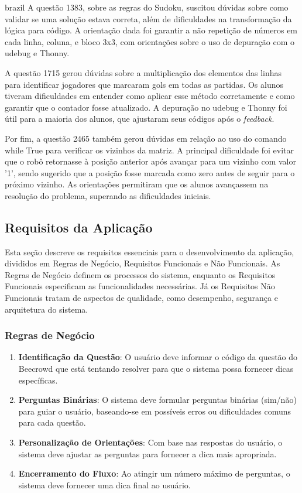\begin{otherlanguage*}{brazil}
A questão 1383, sobre as regras do Sudoku, suscitou dúvidas sobre como validar se uma solução estava correta, além de dificuldades na transformação da lógica para código. A orientação dada foi garantir a não repetição de números em cada linha, coluna, e bloco 3x3, com orientações sobre o uso de depuração com o udebug e Thonny.

A questão 1715 gerou dúvidas sobre a multiplicação dos elementos das linhas para identificar jogadores que marcaram gols em todas as partidas. Os alunos tiveram dificuldades em entender como aplicar esse método corretamente e como garantir que o contador fosse atualizado. A depuração no udebug e Thonny foi útil para a maioria dos alunos, que ajustaram seus códigos após o \textit{feedback}.

Por fim, a questão 2465 também gerou dúvidas em relação ao uso do comando while True para verificar os vizinhos da matriz. A principal dificuldade foi evitar que o robô retornasse à posição anterior após avançar para um vizinho com valor '1', sendo sugerido que a posição fosse marcada como zero antes de seguir para o próximo vizinho. As orientações permitiram que os alunos avançassem na resolução do problema, superando as dificuldades iniciais.

\subsection{Requisitos da Aplicação}
\label{sec:requisitos-aplicacao}

Esta seção descreve os requisitos essenciais para o desenvolvimento da aplicação, divididos em Regras de Negócio, Requisitos Funcionais e Não Funcionais. As Regras de Negócio definem os processos do sistema, enquanto os Requisitos Funcionais especificam as funcionalidades necessárias. Já os Requisitos Não Funcionais tratam de aspectos de qualidade, como desempenho, segurança e arquitetura do sistema.

\subsubsection{Regras de Negócio}

\begin{enumerate}[label=RN\arabic* –]
    \item \textbf{Identificação da Questão}: O usuário deve informar o código da questão do Beecrowd que está tentando resolver para que o sistema possa fornecer dicas específicas.
    \item \textbf{Perguntas Binárias}: O sistema deve formular perguntas binárias (sim/não) para guiar o usuário, baseando-se em possíveis erros ou dificuldades comuns para cada questão.
    \item \textbf{Personalização de Orientações}: Com base nas respostas do usuário, o sistema deve ajustar as perguntas para fornecer a dica mais apropriada.
    \item \textbf{Encerramento do Fluxo}: Ao atingir um número máximo de perguntas, o sistema deve fornecer uma dica final ao usuário.
\end{enumerate}


\end{otherlanguage*}

